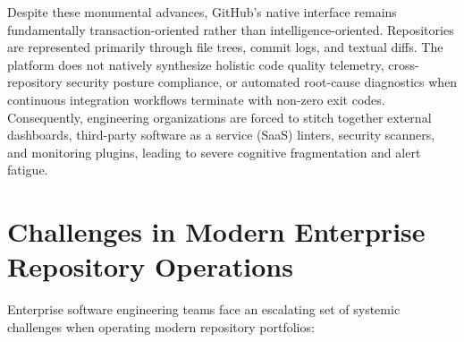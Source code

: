 \documentclass[12pt,a4paper,oneside]{report}
\begin{document}
Despite these monumental advances, GitHub's native interface remains fundamentally transaction-oriented rather than intelligence-oriented. Repositories are represented primarily through file trees, commit logs, and textual diffs. The platform does not natively synthesize holistic code quality telemetry, cross-repository security posture compliance, or automated root-cause diagnostics when continuous integration workflows terminate with non-zero exit codes. Consequently, engineering organizations are forced to stitch together external dashboards, third-party software as a service (SaaS) linters, security scanners, and monitoring plugins, leading to severe cognitive fragmentation and alert fatigue.

\section{Challenges in Modern Enterprise Repository Operations}
\label{sec:challenges}

Enterprise software engineering teams face an escalating set of systemic challenges when operating modern repository portfolios:
\end{document}
